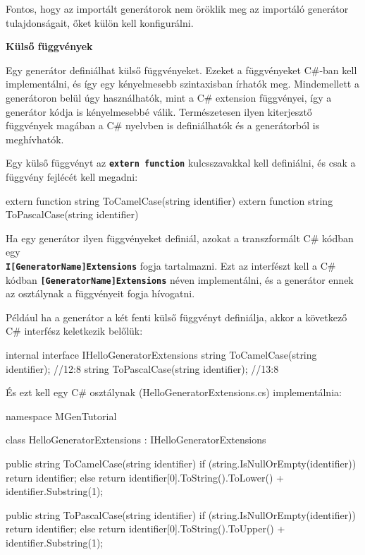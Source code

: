 \documentclass[12pt, a4paper]{report}
\newcommand{\ff}[1]{\textbf{\texttt{#1}}}
\newcommand{\bb}[1]{\textbf{#1}}
\begin{document}
Fontos, hogy az importált generátorok nem öröklik meg az importáló generátor tulajdonságait, őket külön kell konfigurálni.

\bb{Külső függvények}

Egy generátor definiálhat külső függvényeket. Ezeket a függvényeket C\#-ban kell implementálni, és így egy kényelmesebb szintaxisban írhatók meg. Mindemellett a generátoron belül úgy használhatók, mint a C\# extension függvényei, így a generátor kódja is kényelmesebbé válik. Természetesen ilyen kiterjesztő függvények magában a C\# nyelvben is definiálhatók és a generátorból is meghívhatók.

Egy külső függvényt az \ff{extern function} kulcsszavakkal kell definiálni, és csak a függvény fejlécét kell megadni:

\begin{mgencode}
extern function string ToCamelCase(string identifier)
extern function string ToPascalCase(string identifier)
\end{mgencode}

Ha egy generátor ilyen függvényeket definiál, azokat a transzformált C\# kódban egy \\ \ff{I[GeneratorName]Extensions} fogja tartalmazni. Ezt az interfészt kell a C\# kódban \ff{[GeneratorName]Extensions} néven implementálni, és a generátor ennek az osztálynak a függvényeit fogja hívogatni.

Például ha a generátor a két fenti külső függvényt definiálja, akkor a következő C\# interfész keletkezik belőlük:

\begin{csharpcode}
internal interface IHelloGeneratorExtensions
{
	string ToCamelCase(string identifier); //12:8
	string ToPascalCase(string identifier); //13:8
}
\end{csharpcode}

És ezt kell egy C\# osztálynak (HelloGeneratorExtensions.cs) implementálnia:

\begin{csharpcode}
namespace MGenTutorial
{
	class HelloGeneratorExtensions : IHelloGeneratorExtensions
	{
		public string ToCamelCase(string identifier)
		{
			if (string.IsNullOrEmpty(identifier)) return identifier;
			else return identifier[0].ToString().ToLower() + identifier.Substring(1);
		}
		
		public string ToPascalCase(string identifier)
		{
			if (string.IsNullOrEmpty(identifier)) return identifier;
			else return identifier[0].ToString().ToUpper() + identifier.Substring(1);
		}
	}
}
\end{csharpcode}
\end{document}
